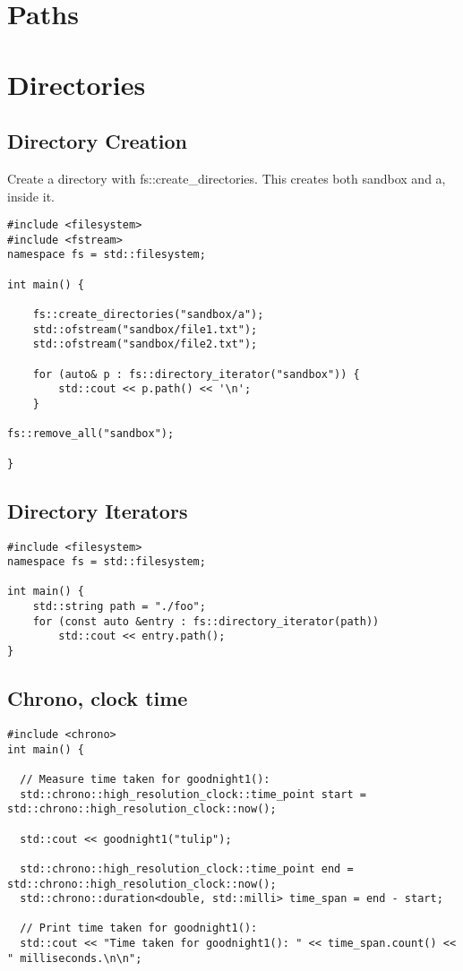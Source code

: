 \documentclass[openany]{report}
\begin{document}
\section{Paths}

\section{Directories}

\subsection{Directory Creation}

Create a directory with fs::create\_directories. This creates both sandbox and a, inside it.

\begin{verbatim}
#include <filesystem>
#include <fstream>
namespace fs = std::filesystem;

int main() {

    fs::create_directories("sandbox/a");
    std::ofstream("sandbox/file1.txt");
    std::ofstream("sandbox/file2.txt");

    for (auto& p : fs::directory_iterator("sandbox")) {
        std::cout << p.path() << '\n';
    } 

fs::remove_all("sandbox");

}
\end{verbatim}

\subsection{Directory Iterators}

\begin{verbatim}
#include <filesystem>
namespace fs = std::filesystem;

int main() {
    std::string path = "./foo";
    for (const auto &entry : fs::directory_iterator(path))
        std::cout << entry.path();
}
\end{verbatim}

\subsection{Chrono, clock time}

\begin{verbatim}
#include <chrono>
int main() {

  // Measure time taken for goodnight1():
  std::chrono::high_resolution_clock::time_point start = std::chrono::high_resolution_clock::now();

  std::cout << goodnight1("tulip");

  std::chrono::high_resolution_clock::time_point end = std::chrono::high_resolution_clock::now();
  std::chrono::duration<double, std::milli> time_span = end - start;

  // Print time taken for goodnight1():
  std::cout << "Time taken for goodnight1(): " << time_span.count() << " milliseconds.\n\n";
\end{verbatim}
\end{document}

